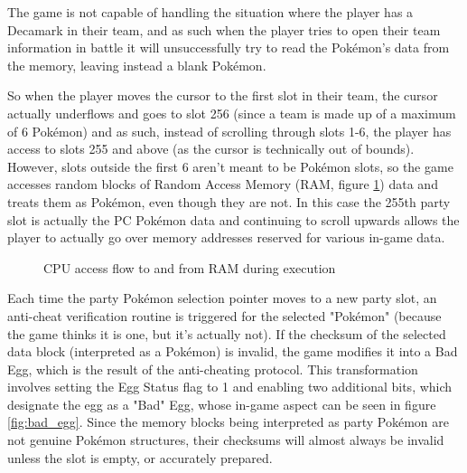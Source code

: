 \documentclass[a4paper]{usiinfbachelorproject}
\begin{document}
The game is not capable of handling the situation where the player has a Decamark in their team, and as such when the player tries to open their team information in battle it will unsuccessfully try to read the Pokémon's data from the memory, leaving instead a blank Pokémon.

So when the player moves the cursor to the first slot in their team, the cursor actually underflows and goes to slot 256 (since a team is made up of a maximum of 6 Pokémon) and as such, instead of scrolling through slots 1-6, the player has access to slots 255 and above (as the cursor is technically out of bounds). However, slots outside the first 6 aren't meant to be Pokémon slots, so the game accesses random blocks of Random Access Memory (RAM, figure \ref{fig:RAM}) data and treats them as Pokémon, even though they are not. In this case the 255th party slot is actually the PC Pokémon data and continuing to scroll upwards allows the player to actually go over memory addresses reserved for various in-game data.

\begin{figure}[h!]
	\caption{CPU access flow to and from RAM during execution}\label{fig:RAM}
\end{figure}

Each time the party Pokémon selection pointer moves to a new party slot, an anti-cheat verification routine is triggered for the selected "Pokémon" (because the game thinks it is one, but it's actually not). If the checksum of the selected data block (interpreted as a Pokémon) is invalid, the game modifies it into a Bad Egg, which is the result of the anti-cheating protocol. This transformation involves setting the Egg Status flag to 1 and enabling two additional bits, which designate the egg as a "Bad" Egg, whose in-game aspect can be seen in figure \ref{fig:bad_egg}. Since the memory blocks being interpreted as party Pokémon are not genuine Pokémon structures, their checksums will almost always be invalid unless the slot is empty, or accurately prepared.
\end{document}
